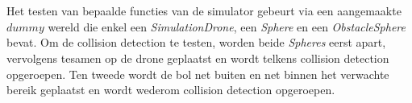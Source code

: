 \\
\\
Het testen van bepaalde functies van de simulator gebeurt via een aangemaakte \(dummy\) wereld die enkel een \textit{SimulationDrone}, een \textit{Sphere} en een \textit{ObstacleSphere} bevat. Om de collision detection te testen, worden beide \textit{Spheres} eerst apart, vervolgens tesamen op de drone geplaatst en wordt telkens collision detection opgeroepen. Ten tweede wordt de bol net buiten en net binnen het verwachte bereik geplaatst en wordt wederom collision detection opgeroepen. 
\\
\\
